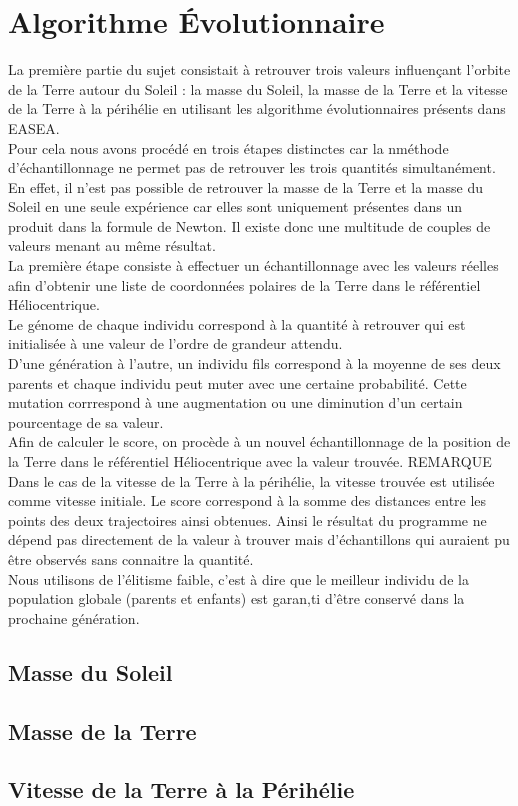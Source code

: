 \section{Algorithme \'Evolutionnaire}

La première partie du sujet consistait à retrouver trois valeurs influençant l'orbite de la Terre autour du Soleil : la masse du Soleil, la masse de la Terre et la vitesse de la Terre à la périhélie en utilisant les algorithme évolutionnaires présents dans EASEA.\\
Pour cela nous avons procédé en trois étapes distinctes car la nméthode d'échantillonnage ne permet pas de retrouver les trois quantités simultanément. En effet, il n'est pas possible de retrouver la masse de la Terre et la masse du Soleil en une seule expérience car elles sont uniquement présentes dans un produit dans la formule de Newton. Il existe donc une multitude de couples de valeurs menant au même résultat.\\
La première étape consiste à effectuer un échantillonnage avec les valeurs réelles afin d'obtenir une liste de coordonnées polaires de la Terre dans le référentiel Héliocentrique.\\
Le génome de chaque individu correspond à la quantité à retrouver qui est initialisée à une valeur de l'ordre de grandeur attendu.\\
D'une génération à l'autre, un individu fils correspond à la moyenne de ses deux parents et chaque individu peut muter avec une certaine probabilité. Cette mutation corrrespond à une augmentation ou une diminution d'un certain pourcentage de sa valeur.\\
Afin de calculer le score, on procède à un nouvel échantillonnage de la position de la Terre dans le référentiel Héliocentrique avec la valeur trouvée. REMARQUE Dans le cas de la vitesse de la Terre à la périhélie, la vitesse trouvée est utilisée comme vitesse initiale. Le score correspond à la somme des distances entre les points des deux trajectoires ainsi obtenues. Ainsi le résultat du programme ne dépend pas directement de la valeur à trouver mais d'échantillons qui auraient pu être observés sans connaitre la quantité.\\
Nous utilisons de l'élitisme faible, c'est à dire que le meilleur individu de la population globale (parents et enfants) est garan,ti d'être conservé dans la prochaine génération.

\subsection{Masse du Soleil}

\subsection{Masse de la Terre}

\subsection{Vitesse de la Terre à la Périhélie}

